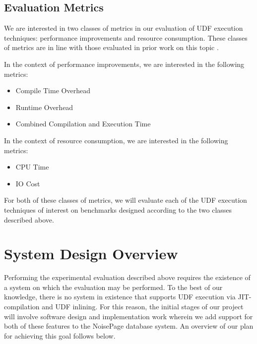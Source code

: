 \documentclass{vldb}
\begin{document}
\subsection{Evaluation Metrics}

We are interested in two classes of metrics in our evaluation of UDF execution techniques: performance improvements and resource consumption. These classes of metrics are in line with those evaluated in prior work on this topic \cite{froid, apfel}.

In the context of performance improvements, we are interested in the following metrics:

\begin{itemize}
    \item Compile Time Overhead
    \item Runtime Overhead
    \item Combined Compilation and Execution Time 
\end{itemize}

In the context of resource consumption, we are interested in the following metrics:

\begin{itemize}
    \item CPU Time
    \item IO Cost
\end{itemize}

For both of these classes of metrics, we will evaluate each of the UDF execution techniques of interest on benchmarks designed according to the two classes described above.


\section{System Design Overview}

Performing the experimental evaluation described above requires the existence of a system on which the evaluation may be performed. To the best of our knowledge, there is no system in existence that supports UDF execution via JIT-compilation and UDF inlining. For this reason, the initial stages of our project will involve software design and implementation work wherein we add support for both of these features to the NoisePage database system. An overview of our plan for achieving this goal follows below.
\end{document}
